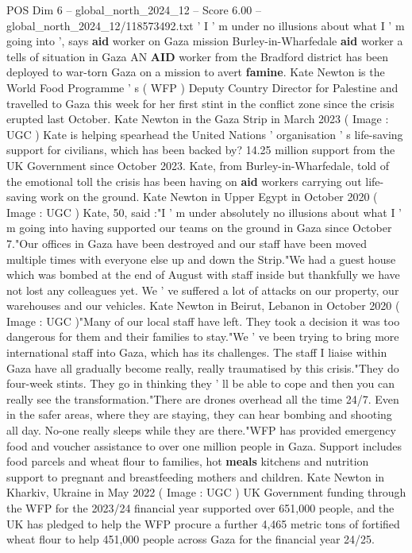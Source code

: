 \begin{textsample}{POS Dim 6 – global\_north\_2024\_12 – Score 6.00 – global\_north\_2024\_12/118573492.txt}  \label{ex:f6_pos_264}
' I ' m under no illusions about what I ' m going into ', says \textbf{aid} worker on Gaza mission Burley-in-Wharfedale \textbf{aid} worker a tells of situation in Gaza AN \textbf{AID} worker from the Bradford district has been deployed to war-torn Gaza on a mission to avert \textbf{famine}.
Kate Newton is the World Food Programme ' s ( WFP ) Deputy Country Director for Palestine and travelled to Gaza this week for her first stint in the conflict zone since the crisis erupted last October.
Kate Newton in the Gaza Strip in March 2023 ( Image : UGC ) Kate is helping spearhead the United Nations ' organisation ' s life-saving support for civilians, which has been backed by? 14.25 million support from the UK Government since October 2023.
Kate, from Burley-in-Wharfedale, told of the emotional toll the crisis has been having on \textbf{aid} workers carrying out life-saving work on the ground.
Kate Newton in Upper Egypt in October 2020 ( Image : UGC ) Kate, 50, said :"I ' m under absolutely no illusions about what I ' m going into having supported our teams on the ground in Gaza since October 7."Our offices in Gaza have been destroyed and our staff have been moved multiple times with everyone else up and down the Strip."We had a guest house which was bombed at the end of August with staff inside but thankfully we have not lost any colleagues yet.
We ' ve suffered a lot of attacks on our property, our warehouses and our vehicles.
Kate Newton in Beirut, Lebanon in October 2020 ( Image : UGC )"Many of our local staff have left.
They took a decision it was too dangerous for them and their families to stay."We ' ve been trying to bring more international staff into Gaza, which has its challenges.
The staff I liaise within Gaza have all gradually become really, really traumatised by this crisis."They do four-week stints.
They go in thinking they ' ll be able to cope and then you can really see the transformation."There are drones overhead all the time 24/7.
Even in the safer areas, where they are staying, they can hear bombing and shooting all day.
No-one really sleeps while they are there."WFP has provided emergency food and voucher assistance to over one million people in Gaza.
Support includes food parcels and wheat flour to families, hot \textbf{meals} kitchens and nutrition support to pregnant and breastfeeding mothers and children.
Kate Newton in Kharkiv, Ukraine in May 2022 ( Image : UGC ) UK Government funding through the WFP for the 2023/24 financial year supported over 651,000 people, and the UK has pledged to help the WFP procure a further 4,465 metric tons of fortified wheat flour to help 451,000 people across Gaza for the financial year 24/25.

\end{textsample}
